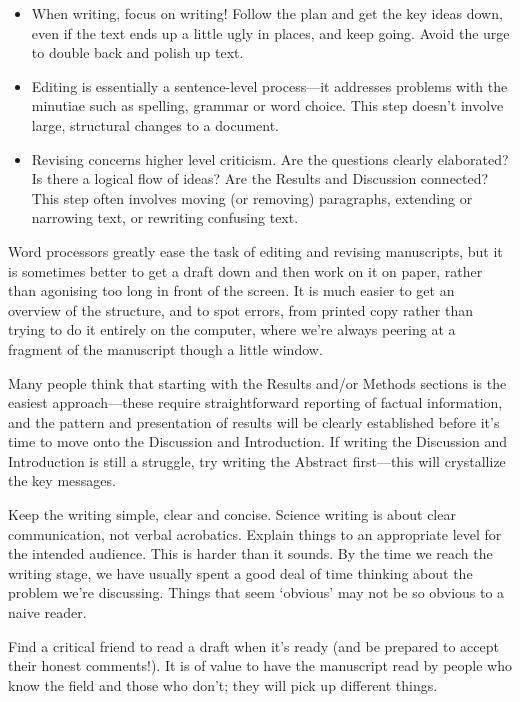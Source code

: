 \documentclass[
]{book}
\begin{document}
\begin{itemize}
\item
  When writing, focus on writing! Follow the plan and get the key ideas down, even if the text ends up a little ugly in places, and keep going. Avoid the urge to double back and polish up text.
\item
  Editing is essentially a sentence-level process---it addresses problems with the minutiae such as spelling, grammar or word choice. This step doesn't involve large, structural changes to a document.
\item
  Revising concerns higher level criticism. Are the questions clearly elaborated? Is there a logical flow of ideas? Are the Results and Discussion connected? This step often involves moving (or removing) paragraphs, extending or narrowing text, or rewriting confusing text.
\end{itemize}

Word processors greatly ease the task of editing and revising manuscripts, but it is sometimes better to get a draft down and then work on it on paper, rather than agonising too long in front of the screen. It is much easier to get an overview of the structure, and to spot errors, from printed copy rather than trying to do it entirely on the computer, where we're always peering at a fragment of the manuscript though a little window.

Many people think that starting with the Results and/or Methods sections is the easiest approach---these require straightforward reporting of factual information, and the pattern and presentation of results will be clearly established before it's time to move onto the Discussion and Introduction. If writing the Discussion and Introduction is still a struggle, try writing the Abstract first---this will crystallize the key messages.

Keep the writing simple, clear and concise. Science writing is about clear communication, not verbal acrobatics. Explain things to an appropriate level for the intended audience. This is harder than it sounds. By the time we reach the writing stage, we have usually spent a good deal of time thinking about the problem we're discussing. Things that seem `obvious' may not be so obvious to a naive reader.

Find a critical friend to read a draft when it's ready (and be prepared to accept their honest comments!). It is of value to have the manuscript read by people who know the field and those who don't; they will pick up different things.
\end{document}
